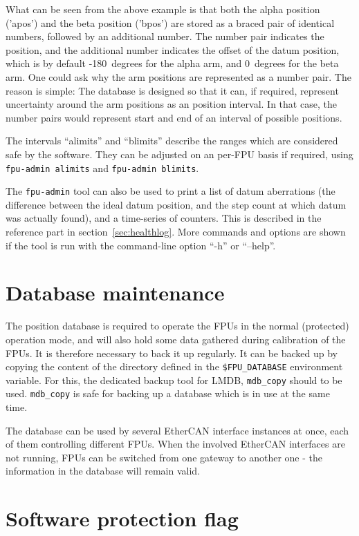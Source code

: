 \documentclass[fontsize=12,a4paper]{scrreprt}
\begin{document}
What can be seen from the above example is that both the alpha
position ('apos') and the beta position ('bpos') are stored as a
braced pair of identical numbers, followed by an additional
number. The number pair indicates the position, and the additional
number indicates the offset of the datum position, which is by default
-180\degree\ degrees for the alpha arm, and 0\degree\ degrees for the beta arm. One
could ask why the arm positions are represented as a number pair. The
reason is simple: The database is designed so that it can, if
required, represent uncertainty around the arm positions as an
position interval. In that case, the number pairs would represent
start and end of an interval of possible positions.

The intervals ``alimits'' and ``blimits'' describe the ranges which
are considered safe by the software. They can be adjusted on an
per-FPU basis if required, using \texttt{fpu-admin alimits} and
\texttt{fpu-admin blimits}.

The \texttt{fpu-admin} tool can also be used to print a list of datum
aberrations (the difference between the ideal datum position, and the
step count at which datum was actually found), and a time-series of
counters. This is described in the reference part in
section~\ref{sec:healthlog}. More commands and options are shown if the
tool is run with the command-line option ``-h'' or ``--help''.

\section{Database maintenance}
 The position database is
required to operate the FPUs in the normal (protected) operation mode,
and will also hold some data gathered during calibration of the
FPUs. It is therefore necessary to back it up regularly.  It can be
backed up by copying the content of the directory defined in the
\verb+$FPU_DATABASE+ environment variable. For this, the dedicated
backup tool for LMDB, \texttt{mdb\_copy} should to be
used. \texttt{mdb\_copy} is safe for backing up a database which is in
use at the same time.

The database can be used by several EtherCAN interface instances at once, each of
them controlling different FPUs. When the involved EtherCAN interfaces are not
running, FPUs can be switched from one gateway to another one - the
information in the database will remain valid.

\section{Software protection flag}
\label{sec:protectionintro}
\end{document}
